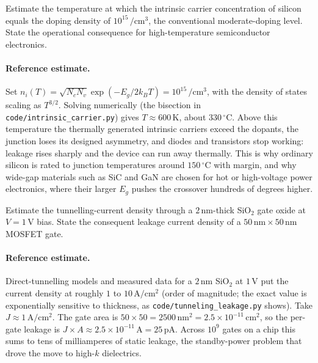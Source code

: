 \begin{exercise}
Estimate the temperature at which the intrinsic carrier concentration
of silicon equals the doping density of $10^{15}\,\si{\per\centi
\meter\cubed}$, the conventional moderate-doping level. State the
operational consequence for high-temperature semiconductor electronics.
\paragraph{Reference estimate.} Set $n_{i}(T) = \sqrt{N_{c}N_{v}}\exp(
-E_{g}/2k_{B}T) = 10^{15}\,\si{\per\centi\meter\cubed}$, with the
density of states scaling as $T^{3/2}$. Solving numerically (the
bisection in \texttt{code/intrinsic\_carrier.py}) gives $T \approx
600\,\si{\kelvin}$, about $330\,{}^{\circ}\mathrm{C}$. Above this
temperature the thermally generated intrinsic carriers exceed the
dopants, the junction loses its designed asymmetry, and diodes and
transistors stop working: leakage rises sharply and the device can run
away thermally. This is why ordinary silicon is rated to junction
temperatures around $150\,{}^{\circ}\mathrm{C}$ with margin, and why
wide-gap materials such as SiC and GaN are chosen for hot or
high-voltage power electronics, where their larger $E_{g}$ pushes the
crossover hundreds of degrees higher.
\end{exercise}

\begin{exercise}
Estimate the tunnelling-current density through a $2\,\si{\nano
\meter}$-thick SiO$_{2}$ gate oxide at $V = 1\,\si{\volt}$ bias.
State the consequent leakage current density of a $50\,\si{\nano
\meter}\times 50\,\si{\nano\meter}$ MOSFET gate.
\paragraph{Reference estimate.} Direct-tunnelling models and measured
data for a $2\,\si{\nano\meter}$ SiO$_{2}$ at $1\,\si{\volt}$ put the
current density at roughly $1$ to $10\,\si{\ampere\per\centi\meter
\squared}$ (order of magnitude; the exact value is exponentially
sensitive to thickness, as \texttt{code/tunneling\_leakage.py} shows).
Take $J \approx 1\,\si{\ampere\per\centi\meter\squared}$. The gate area
is $50\times 50 = 2500\,\si{\nano\meter\squared} = 2.5\times 10^{-11}
\,\si{\centi\meter\squared}$, so the per-gate leakage is $J\times A
\approx 2.5\times 10^{-11}\,\si{\ampere} = 25\,\si{\pico\ampere}$.
Across $10^{9}$ gates on a chip this sums to tens of milliamperes of
static leakage, the standby-power problem that drove the move to
high-$k$ dielectrics.
\end{exercise}

